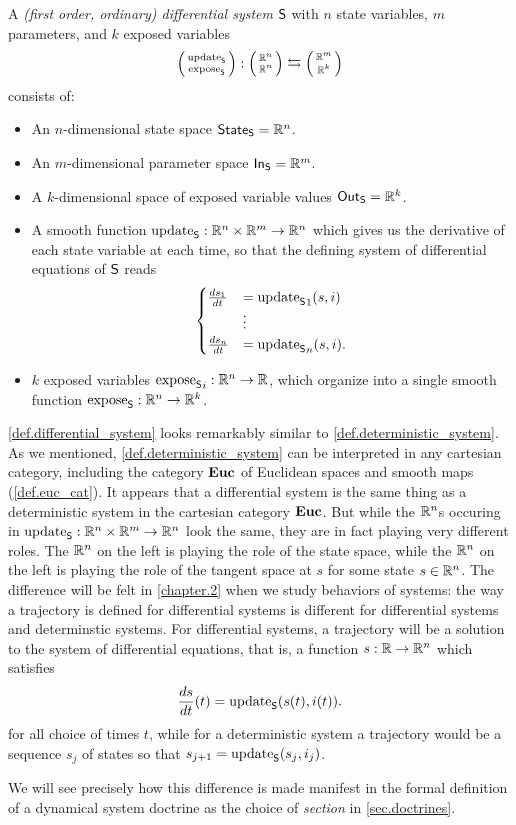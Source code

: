 \documentclass[DynamicalBook]{subfiles}
\begin{document}
\begin{definition}\label{def.differential_system}
  A \emph{(first order, ordinary) differential system} $\mathsf{S}$ with $n$ state variables, $m$
  parameters, and $k$ exposed variables 
\[
  \lens{\update{S}}{\expose{S}} : \lens{\rr^{n}}{\rr^n} \leftrightarrows \lens{\rr^m}{\rr^k}
\]
consists of:
\begin{itemize}
  \item An $n$-dimensional state space $\mathsf{State}_{\mathsf{S}} = \mathbb{R}^n$.
\item An $m$-dimensional parameter space $\mathsf{In}_{\mathsf{S}} = \mathbb{R}^m$.
\item A $k$-dimensional space of exposed variable values $\mathsf{Out}_{\mathsf{S}} = \mathbb{R}^k$.
\item A smooth function $\mathrm{update}_{\mathsf{S}} : \mathbb{R}^n \times \mathbb{R}^m \to \mathbb{R}^n$ which gives us the
  derivative of each state variable at each time, so that the defining
  system of differential equations of $\mathsf{S}$ reads
\[
\begin{cases}
\frac{ds_1}{dt} &= {\mathrm{update}_{\mathsf{S}}}_1(s,i) \\
&\vdots \\
\frac{ds_n}{dt} &= {\mathrm{update}_{\mathsf{S}}}_n(s, i).
\end{cases}
\]
\item $k$ exposed variables ${\mathrm{expose}_{\mathsf{S}}}_i : \mathbb{R}^n \to \mathbb{R}$, which organize into
  a single smooth function $\mathrm{expose}_{\mathsf{S}} : \mathbb{R}^n \to \mathbb{R}^k$.
\end{itemize}
\end{definition}


\begin{remark}
  \cref{def.differential_system} looks remarkably similar to
  \cref{def.deterministic_system}. As we mentioned,
  \cref{def.deterministic_system} can be interpreted in any cartesian category,
  including the category $\textbf{Euc}$ of Euclidean spaces and smooth maps
  (\cref{def.euc_cat}). It appears that a differential system is the same thing as a
  deterministic system in the cartesian category $\textbf{Euc}$. But while the
  $\mathbb{R}^n$s occuring in $\mathrm{update}_{\mathsf{S}} : \mathbb{R}^n \times \mathbb{R}^m \to \mathbb{R}^n$ look the
  same, they are in fact playing very different roles. The $\mathbb{R}^n$ on the left
  is playing the role of the state space, while the $\mathbb{R}^n$ on the left is
  playing the role of the tangent space at $s$ for some state $s \in \mathbb{R}^n$. The
  difference will be felt in \cref{chapter.2} when we study behaviors of
  systems: the way a trajectory is defined for differential systems is different
  for differential systems and determinstic systems. For differential systems, a
  trajectory will be a solution to the system of differential equations, that
  is, a function $s : \mathbb{R} \to \mathbb{R}^n$ which satisfies 
$$\frac{ds}{dt}(t) = \mathrm{update}_{\mathsf{S}}(s(t), i(t)).$$
for all choice of times $t$, while for a deterministic system a trajectory would
be a sequence $s_j$ of states so that $s_{j + 1} = \mathrm{update}_{\mathsf{S}}(s_j, i_j)$. 

 We will see precisely how
  this difference is made manifest in the formal definition of a dynamical
  system doctrine as the choice of \emph{section} in \cref{sec.doctrines}.
\end{remark}
\end{document}
